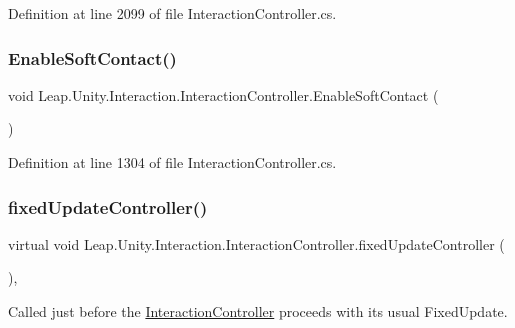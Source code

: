 Definition at line 2099 of file Interaction\+Controller.\+cs.

\mbox{\label{class_leap_1_1_unity_1_1_interaction_1_1_interaction_controller_a1ca697cb7222397e5047941731edd03b}} 
\subsubsection{\texorpdfstring{EnableSoftContact()}{EnableSoftContact()}}
{\footnotesize\ttfamily void Leap.\+Unity.\+Interaction.\+Interaction\+Controller.\+Enable\+Soft\+Contact (\begin{DoxyParamCaption}{ }\end{DoxyParamCaption})}



Definition at line 1304 of file Interaction\+Controller.\+cs.

\mbox{\label{class_leap_1_1_unity_1_1_interaction_1_1_interaction_controller_ad66e5a09bdbe3e9573a504734bbc34f8}} 
\subsubsection{\texorpdfstring{fixedUpdateController()}{fixedUpdateController()}}
{\footnotesize\ttfamily virtual void Leap.\+Unity.\+Interaction.\+Interaction\+Controller.\+fixed\+Update\+Controller (\begin{DoxyParamCaption}{ }\end{DoxyParamCaption})\hspace{0.3cm}{\ttfamily [protected]}, {\ttfamily [virtual]}}



Called just before the \mbox{\hyperlink{class_leap_1_1_unity_1_1_interaction_1_1_interaction_controller}{Interaction\+Controller}} proceeds with its usual Fixed\+Update. 

